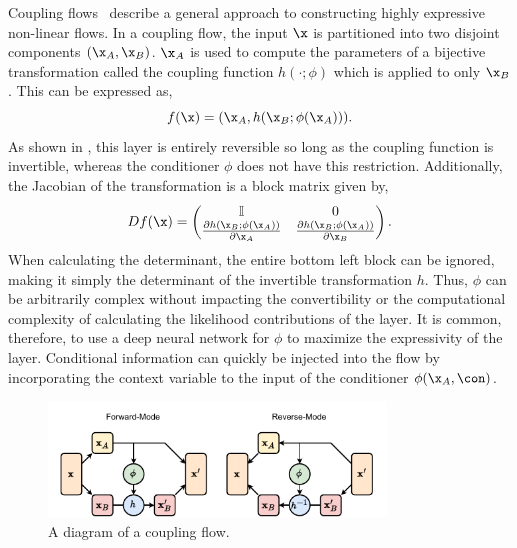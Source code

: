 Coupling flows~\cite{NICENonlinearIndependent} describe a general approach to constructing highly expressive non-linear flows.
In a coupling flow, the input $\x$ is partitioned into two disjoint components $(\x_A, \x_B)$.
$\x_A$ is used to compute the parameters of a bijective transformation called the coupling function $h(\cdot; \phi)$ which is applied to only $\x_B$.
This can be expressed as,
\begin{equation}
    \label{eq:coupling_flow}
    f(\x) = (\x_A, h(\x_B; \phi(\x_A))).
\end{equation}
As shown in , this layer is entirely reversible so long as the coupling function is invertible, whereas the conditioner $\phi$ does not have this restriction.
Additionally, the Jacobian of the transformation is a block matrix given by,
\begin{equation}
    D f(\x) = \begin{pmatrix}
        \mathbb{I} & 0 \\
        \frac{\partial h(\x_B; \phi(\x_A))}{\partial \x_A} & \frac{\partial h(\x_B; \phi(\x_A))}{\partial \x_B}
    \end{pmatrix}.
\end{equation}
When calculating the determinant, the entire bottom left block can be ignored, making it simply the determinant of the invertible transformation $h$.
Thus, $\phi$ can be arbitrarily complex without impacting the convertibility or the computational complexity of calculating the likelihood contributions of the layer.
It is common, therefore, to use a deep neural network for $\phi$ to maximize the expressivity of the layer.
Conditional information can quickly be injected into the flow by incorporating the context variable to the input of the conditioner $\phi(\x_A, \con)$.

\begin{figure}[ht]
    \centering
    \includegraphics[width=0.8\textwidth]{Figures/generative_models/coupling.pdf}
    \caption{A diagram of a coupling flow.}
    \label{fig:coupling_flow}
\end{figure}


